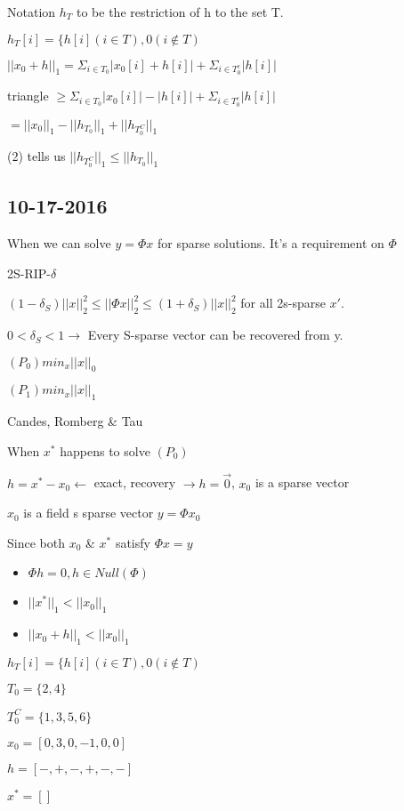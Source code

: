 \documentclass[12pt,letterpaper]{report}
\begin{document}
Notation $h_T$ to be the restriction of h to the set T.

$h_T[i] = \{ h[i] (i \in T), 0 (i \not\in T)$

$||x_0 + h||_1 = \Sigma_{i \in T_0} |x_0[i] + h[i]| + \Sigma_{i \in T_0^c}|h[i]|$

triangle $\geq \Sigma_{i \in T_0} |x_0[i]| - |h[i]| + \Sigma_{i \in T_0^c}|h[i]|$

$= ||x_0||_1 - ||h_{T_0}||_1 + ||h_{T_0^C}||_1$

(2) tells us $||h_{T_0^C}||_1 \leq ||h_{T_0}||_1$


\subsection*{10-17-2016}

When we can solve $y = \Phi x$ for sparse solutions.  It's a requirement on $\Phi$

2S-RIP-$\delta$

$(1-\delta_S)||x||_2^2 \leq ||\Phi x||_2^2 \leq (1+\delta_S)||x||_2^2$ for all 2s-sparse $x'$.

$0 < \delta_S < 1 \rightarrow$ Every S-sparse vector can be recovered from y.


$(P_0) min_x ||x||_0$

$(P_1) min_x ||x||_1$

Candes, Romberg \& Tau

When $x^*$ happens to solve $(P_0)$

$h = x^* - x_0 \leftarrow$ exact, recovery $\rightarrow h = \vec{0}$, $x_0$ is a sparse vector

$x_0$ is a field s sparse vector $y = \Phi x_0$

Since both $x_0$ \& $x^*$ satisfy $\Phi x = y$

\begin{itemize}
\item $\Phi h = 0, h \in Null(\Phi)$
\item $||x^*||_1 < ||x_0||_1$
\item $||x_0 + h||_1 < ||x_0||_1$
\end{itemize}

$h_T[i] = \{ h[i] (i \in T), 0 (i \not\in T)$


$T_0 = \{2,4\}$

$T_0^C = \{1,3,5,6\}$

$x_0 = [0, 3, 0, -1, 0, 0]$

$h = [-, +, -, +, -, -]$

$x^* = [ ]$
\end{document}
